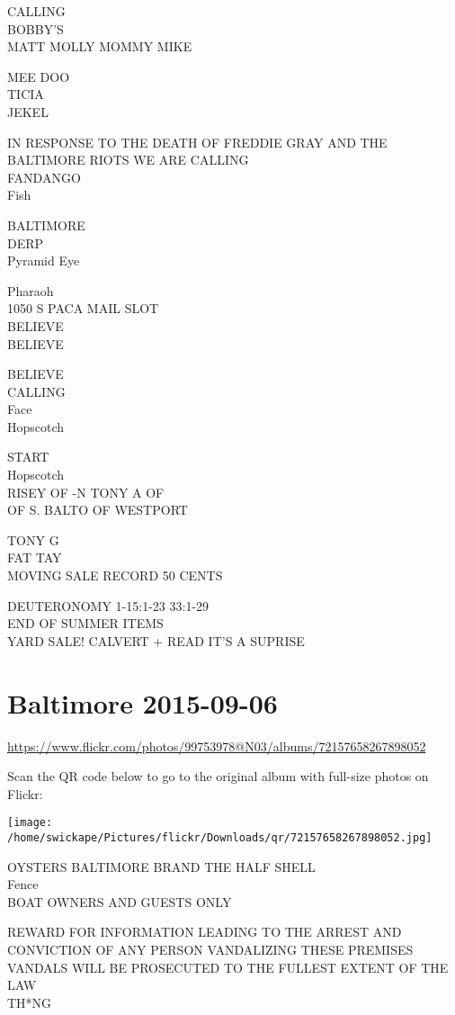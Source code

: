 \documentclass[10pt,letterpaper]{article}
\begin{document}
CALLING\\
BOBBY'S\\
MATT MOLLY MOMMY MIKE

MEE DOO\\
TICIA\\
JEKEL

IN RESPONSE TO THE DEATH OF FREDDIE GRAY AND THE BALTIMORE RIOTS WE ARE CALLING\\
FANDANGO\\
Fish

BALTIMORE\\
DERP\\
Pyramid Eye

Pharaoh\\
1050 S PACA MAIL SLOT\\
BELIEVE\\
BELIEVE

BELIEVE\\
CALLING\\
Face\\
Hopscotch

START\\
Hopscotch\\
RISEY OF {-}N TONY A OF\\
OF S. BALTO OF WESTPORT

TONY G\\
FAT TAY\\
MOVING SALE RECORD 50 CENTS

DEUTERONOMY 1{-}15:1{-}23 33:1{-}29\\
END OF SUMMER ITEMS\\
YARD SALE! CALVERT + READ IT'S A SUPRISE
\pagebreak

\section*{Baltimore 2015-09-06}

\url{https://www.flickr.com/photos/99753978@N03/albums/72157658267898052}

Scan the QR code below to go to the original album with full-size photos on Flickr:

\texttt{[image: /home/swickape/Pictures/flickr/Downloads/qr/72157658267898052.jpg]}
\pagebreak

OYSTERS BALTIMORE BRAND THE HALF SHELL\\
Fence\\
BOAT OWNERS AND GUESTS ONLY

REWARD FOR INFORMATION LEADING TO THE ARREST AND CONVICTION OF ANY PERSON VANDALIZING THESE PREMISES VANDALS WILL BE PROSECUTED TO THE FULLEST EXTENT OF THE LAW\\
TH*NG
\end{document}
